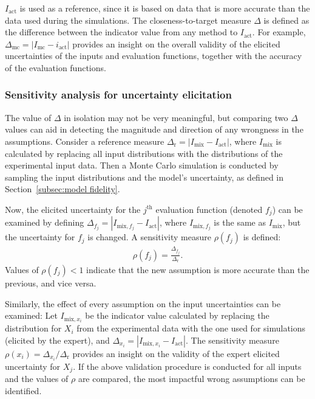 \documentclass[10pt]{llncs}
\newcommand{\brr}[1]{{\left({#1}\right)}} %
\newcommand{\brabs}[1]{\left\vert{#1}\right\vert} %
\begin{document}
$I_\text{act}$ is used as a reference, since it is based on data that is more accurate than the data used during the simulations. The closeness-to-target measure $\Delta$ is defined as the difference between the indicator value from any method to $I_\text{act}$. For example, $\Delta_\text{mc} = \brabs{I_\text{mc}-i_\text{act}}$ provides an insight on the overall validity of the elicited uncertainties of the inputs and evaluation functions, together with the accuracy of the evaluation functions.

\subsubsection{Sensitivity analysis for uncertainty elicitation}
\label{subsubsec:sensitivity}
The value of $\Delta$ in isolation may not be very meaningful, but comparing two $\Delta$ values can aid in detecting the magnitude and direction of any wrongness in the assumptions.
Consider a reference measure $\Delta_\text{r} = \brabs{I_\text{mix}-I_\text{act}}$, where $I_\text{mix}$ is calculated by replacing all input distributions with the distributions of the experimental input data. Then a Monte Carlo simulation is conducted by sampling the input distributions and the model's uncertainty, as defined in Section~\ref{subsec:model fidelity}.

Now, the elicited uncertainty for the $j^\text{th}$ evaluation function (denoted $f_j$) can be examined by defining  $\Delta_{f_j} = \brabs{I_{\text{mix},f_j}-I_\text{act}}$, where $I_{\text{mix},f_j}$ is the same as $I_\text{mix}$, but the uncertainty for $f_j$ is changed. A sensitivity measure $\rho\brr{f_j}$ is defined:
\begin{align}
	\rho\brr{f_j} = \frac{\Delta_{f_j}}{\Delta_\text{r}}.
\end{align}
Values of $\rho\brr{f_j} < 1$ indicate that the new assumption is more accurate than the previous, and vice versa.

Similarly, the effect of every assumption on the input uncertainties can be examined: Let $I_{\text{mix},x_i}$ be the indicator value calculated by replacing the distribution for $X_i$ from the experimental data with the one used for simulations (elicited by the expert), and $\Delta_{x_i} = \brabs{I_{\text{mix},x_i}-I_\text{act}}$. The sensitivity measure $\rho\brr{x_i} = \Delta_{x_i} / \Delta_\text{r}$ provides an insight on the validity of the expert elicited uncertainty for $X_j$.
If the above validation procedure is conducted for all inputs and the values of $\rho$ are compared, the most impactful wrong assumptions can be identified.
\end{document}
